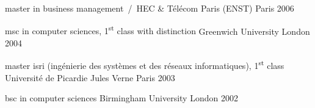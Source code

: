 


\begin{cventries}

  \cventry
    {master in business management} %
    {\,/\, HEC \& Télécom Paris (ENST)} %
    {Paris} %
    {2006} %
    {}
    {}

  \cventry
    {msc in computer sciences, 1\textsuperscript{st} class with distinction} %
    {\hspace{0.5em}Greenwich University} %
    {London} %
    {2004} %
    {}
    {}

  \cventry
    {master isri (ingénierie des systèmes et des réseaux informatiques), 1\textsuperscript{st} class} %
    {\hspace{0.5em}Université de Picardie Jules Verne} %
    {Paris} %
    {2003} %
    {}
    {}

  \cventry
    {bsc in computer sciences} %
    {\hspace{0.5em}Birmingham University} %
    {London} %
    {2002} %
    {}
    {}
\end{cventries}
